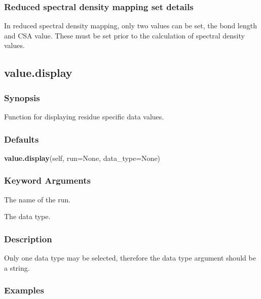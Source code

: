\subsubsection{Reduced spectral density mapping set details}

In reduced spectral density mapping, only two values can be set, the bond length and CSA value.  These must be set prior to the calculation of spectral density values.




\newpage

\subsection{value.display}


\subsubsection{Synopsis}

Function for displaying residue specific data values.



\subsubsection{Defaults}

\textsf{\textbf{value.display}(self, run=None, data\_type=None)}


\subsubsection{Keyword Arguments}

  The name of the run. 

  The data type. 




\subsubsection{Description}

Only one data type may be selected, therefore the data type argument should be a string.



\subsubsection{Examples}

